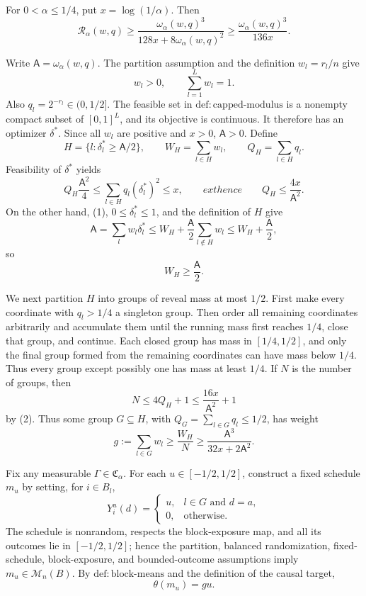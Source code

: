 For \(0<\alpha\le 1/4\), put \(x=\log(1/\alpha)\).  Then
\[
 \mathcal R_\alpha(w,q)
 \ge
 \frac{\omega_\alpha(w,q)^3}
      {128x+8\omega_\alpha(w,q)^2}
 \ge
 \frac{\omega_\alpha(w,q)^3}{136x}.
\]

Write \(\mathsf A=\omega_\alpha(w,q)\).  The partition assumption and
the definition \(w_l=r_l/n\) give
\[
 w_l>0,\qquad \sum_{l=1}^Lw_l=1.
\tag{1}
\]
Also \(q_l=2^{-r_l}\in(0,1/2]\).  The feasible set in
\(\mathrm{def{:}capped\text{-}modulus}\) is a nonempty compact subset
of \([0,1]^L\), and its objective is continuous.  It therefore has an
optimizer \(\delta^*\).  Since all \(w_l\) are positive and \(x>0\),
\(\mathsf A>0\).  Define
\[
 H=\{l:\delta_l^*\ge \mathsf A/2\},
 \qquad W_H=\sum_{l\in H}w_l,
 \qquad Q_H=\sum_{l\in H}q_l.
\]
Feasibility of \(\delta^*\) yields
\[
 Q_H\frac{\mathsf A^2}{4}
 \le \sum_{l\in H}q_l(\delta_l^*)^2
 \le x,
 \qquad	ext{hence}\qquad
 Q_H\le \frac{4x}{\mathsf A^2}.
\tag{2}
\]
On the other hand, (1), \(0\le\delta_l^*\le1\), and the definition of
\(H\) give
\[
 \mathsf A=\sum_lw_l\delta_l^*
 \le W_H+\frac{\mathsf A}{2}\sum_{l\notin H}w_l
 \le W_H+\frac{\mathsf A}{2},
\]
so
\[
 W_H\ge \frac{\mathsf A}{2}.
\tag{3}
\]

We next partition \(H\) into groups of reveal mass at most \(1/2\).
First make every coordinate with \(q_l>1/4\) a singleton group.  Then
order all remaining coordinates arbitrarily and accumulate them until
the running mass first reaches \(1/4\), close that group, and continue.
Each closed group has mass in \([1/4,1/2]\), and only the final group
formed from the remaining coordinates can have mass below \(1/4\).
Thus every group except possibly one has mass at least \(1/4\).  If
\(N\) is the number of groups, then
\[
 N\le4Q_H+1\le\frac{16x}{\mathsf A^2}+1
\tag{4}
\]
by (2).  Thus some group \(G\subseteq H\), with
\(Q_G=\sum_{l\in G}q_l\le1/2\), has weight
\[
 g:=\sum_{l\in G}w_l
 \ge\frac{W_H}{N}
 \ge\frac{\mathsf A^3}{32x+2\mathsf A^2}.
\tag{5}
\]

Fix any measurable \(\Gamma\in\mathfrak C_\alpha\).  For each
\(u\in[-1/2,1/2]\), construct a fixed schedule \(m_u\) by setting, for
\(i\in B_l\),
\[
 Y_i^u(d)=
 \begin{cases}
 u,&l\in G\text{ and }d=a,\\
 0,&\text{otherwise}.
 \end{cases}
\tag{6}
\]
The schedule is nonrandom, respects the block-exposure map, and all
its outcomes lie in \([-1/2,1/2]\); hence the partition, balanced
randomization, fixed-schedule, block-exposure, and bounded-outcome
assumptions imply \(m_u\in\mathcal M_n(B)\).  By
\(\mathrm{def{:}block\text{-}means}\) and the definition of the causal
target,
\[
 \theta(m_u)=gu.
\tag{7}
\]


